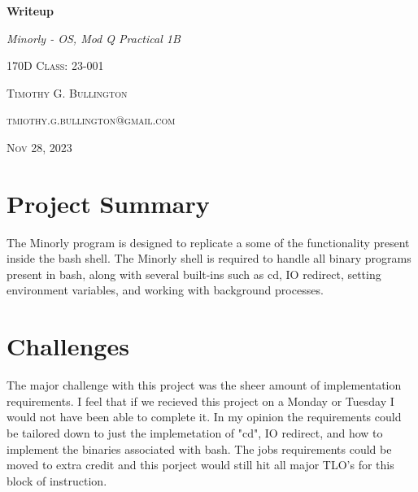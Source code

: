 \documentclass{article}
\begin{document}
\begin{titlepage}
    \begin{center}
        \vspace*{6cm}

        
        \textbf{\Huge{Writeup}}
            
        \vspace{0.5cm}
        \textit{\large{Minorly - OS, Mod Q Practical 1B}}
        \vspace{0.5cm}
        
        \textsc{\large{170D Class: 23-001}}
            
        \vspace{7.5cm}
            
        \textsc{\small{Timothy G. Bullington}}
        \vspace{0.5cm}
        
        \textsc{\small{tmiothy.g.bullington@gmail.com}}

        \vspace{0.5cm}
        \textsc{\small{Nov 28, 2023}}

            

    \end{center}
\end{titlepage}

\section{Project Summary}

The Minorly program is designed to replicate a some of the functionality present inside the bash shell. The Minorly shell is required to handle all binary programs present in bash, along with several built-ins such as cd, IO redirect, setting environment variables, and working with background processes.\\

\section{Challenges}

The major challenge with this project was the sheer amount of implementation requirements. I feel that if we recieved this project on a Monday or Tuesday I would not have been able to complete it. In my opinion the requirements could be tailored down to just the implemetation of "cd", IO redirect, and how to implement the binaries associated with bash. The jobs requirements could be moved to extra credit and this porject would still hit all major TLO's for this block of instruction. \\
\end{document}

